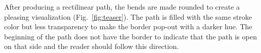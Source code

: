 %

After producing a rectilinear path, the bends are made rounded to create a pleasing visualization (Fig.~\ref{fig:teaser}). The path is filled with the same stroke color but less transparency to make the border pop-out with a darker hue. The beginning of the path does not have the border to indicate that the path is open on that side and the reader should follow this direction. 



